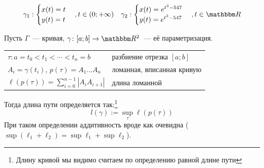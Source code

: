 \documentclass[12pt]{../../notes}
\begin{document}
\begin{exmp*}
  \begin{align*}
    \gamma_1 : 
    \begin{cases}
      x(t) = t \\
      y(t) = t
    \end{cases}, t \in (0;+\infty) & &
    \gamma_2 :
    \begin{cases}
      x(t) = e^{t^3-547} \\
      y(t) = e^{t^3-547} \\
    \end{cases}, t \in \R
  \end{align*}
\end{exmp*}

\begin{defn}\label{defn:curvelen}
  Пусть $\Gamma$~--- кривая, $\gamma\colon [a;b] \to \R^2$~--- её параметризация.

  \begin{tabular}[h]{ll}
    $\tau: a = t_0 < t_1 < \dotsb < t_n = b$ & разбиение отрезка $[a;b]$ \\
    $A_i = \gamma(t_i)$, $p(\tau) = A_1\dotso A_n$ & ломанная, вписанная кривую \\
    $\displaystyle \ell(p(\tau)) = \sum_{i=0}^{n-1} |A_iA_{i+1}|$ & длина ломанной
  \end{tabular}
  
  Тогда длина пути определяется так:\footnote{Длину кривой мы видимо считаем по определению равной длине пути}
  \[
    l(\gamma) := \sup_\tau \ell(p(\tau))
  \]
  При таком определении аддитивность вроде как очевидна ($\sup (\ell_1+\ell_2) = \sup \ell_1 + \sup \ell_2$).
\end{defn}
\end{document}

